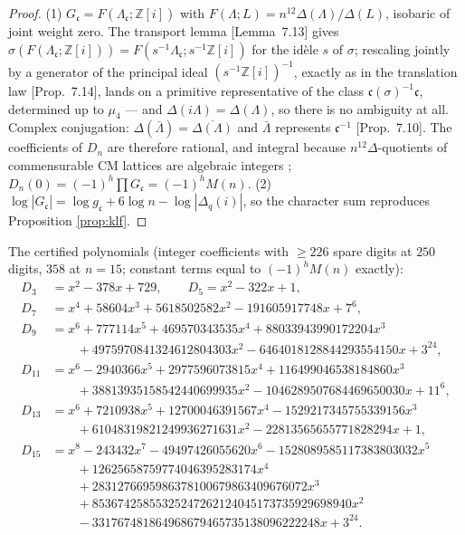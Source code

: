 \documentclass[11pt]{amsart}
\numberwithin{equation}{section}
\theoremstyle{plain}
\theoremstyle{definition}
\theoremstyle{remark}
\newcommand{\Z}{\mathbb{Z}}
\newcommand{\Zi}{\Z[i]}
\newcommand{\idealc}{\mathfrak{c}}
\newcommand{\PaperI}{\cite{SchmidtI}}
\begin{document}
\begin{proof}
(1) $G_\idealc = F(\Lambda_\idealc; \Zi)$ with $F(\Lambda; L) =
n^{12}\Delta(\Lambda)/\Delta(L)$, isobaric of joint weight zero.  The
transport lemma \PaperI[Lemma~7.13] gives $\sigma(F(\Lambda_\idealc;\Zi))
= F(s^{-1}\Lambda_\idealc; s^{-1}\Zi)$ for the id\`ele $s$ of $\sigma$;
rescaling jointly by a generator of the principal ideal
$(s^{-1}\Zi)^{-1}$, exactly as in the translation law \PaperI[Prop.~7.14],
lands on a primitive representative of the class
$\idealc(\sigma)^{-1}\idealc$, determined up to $\mu_4$ --- and
$\Delta(i\Lambda) = \Delta(\Lambda)$, so there is no ambiguity at all.
Complex conjugation: $\Delta(\bar\Lambda) = \overline{\Delta(\Lambda)}$
and $\bar\Lambda$ represents $\idealc^{-1}$ \PaperI[Prop.~7.10].  The
coefficients of $D_n$ are therefore rational, and integral because
$n^{12}\Delta$-quotients of commensurable CM lattices are algebraic
integers \cite[Ch.~12]{Lang1987}; $D_n(0) = (-1)^h\prod G_\idealc =
(-1)^hM(n)$.  (2) $\log|G_\idealc| = \log g_\idealc + 6\log n -
\log|\Delta_q(i)|$, so the character sum reproduces Proposition
\ref{prop:klf}.
\end{proof}

The certified polynomials (integer coefficients with $\ge 226$ spare
digits at $250$ digits, $358$ at $n = 15$; constant terms equal to
$(-1)^hM(n)$ exactly):
\begin{align*}
D_3 &= x^2 - 378x + 729, \qquad D_5 = x^2 - 322x + 1,\\
D_7 &= x^4 + 58604x^3 + 5618502582x^2 - 191605917748x + 7^{6},\\
D_9 &= x^6 + 777114x^5 + 469570343535x^4 + 88033943990172204x^3\\
    &\qquad + 4975970841324612804303x^2 - 6464018128844293554150x + 3^{24},\\
D_{11} &= x^6 - 2940366x^5 + 2977596073815x^4 + 116499046538184860x^3\\
    &\qquad + 38813935158542440699935x^2 - 1046289507684469650030x + 11^{6},\\
D_{13} &= x^6 + 7210938x^5 + 12700046391567x^4 - 1529217345755339156x^3\\
    &\qquad + 61048319821249936271631x^2 - 22813565655771828294x + 1,\\
D_{15} &= x^8 - 243432x^7 - 49497426055620x^6 - 1528089585117383803032x^5\\
    &\qquad + 12625658759774046395283174x^4\\
    &\qquad + 2831276695986378100679863409676072x^3\\
    &\qquad + 85367425855325247262124045173735929698940x^2\\
    &\qquad - 331767481864968679465735138096222248x + 3^{24}.
\end{align*}
\end{document}
